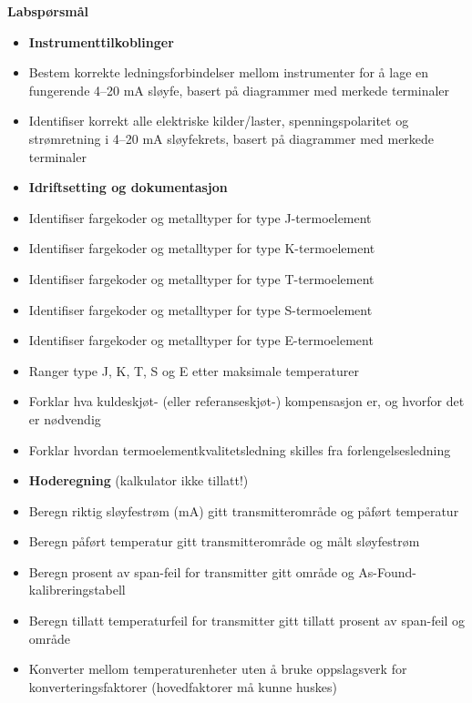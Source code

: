 \noindent
{\bf Labspørsmål}

\vskip 5pt

\begin{itemize}
\item{} {\bf Instrumenttilkoblinger}
\item{} Bestem korrekte ledningsforbindelser mellom instrumenter for å lage en fungerende 4--20 mA sløyfe, basert på diagrammer med merkede terminaler
\item{} Identifiser korrekt alle elektriske kilder/laster, spenningspolaritet og strømretning i 4--20 mA sløyfekrets, basert på diagrammer med merkede terminaler
\end{itemize}

\filbreak

\begin{itemize}
\item{} {\bf Idriftsetting og dokumentasjon}
\item{} Identifiser fargekoder og metalltyper for type J-termoelement
\item{} Identifiser fargekoder og metalltyper for type K-termoelement
\item{} Identifiser fargekoder og metalltyper for type T-termoelement
\item{} Identifiser fargekoder og metalltyper for type S-termoelement
\item{} Identifiser fargekoder og metalltyper for type E-termoelement
\item{} Ranger type J, K, T, S og E etter maksimale temperaturer
\item{} Forklar hva kuldeskjøt- (eller referanseskjøt-) kompensasjon er, og hvorfor det er nødvendig
\item{} Forklar hvordan termoelementkvalitetsledning skilles fra forlengelsesledning
\end{itemize}

\filbreak

\begin{itemize}
\item{} {\bf Hoderegning} (kalkulator ikke tillatt!)
\item{} Beregn riktig sløyfestrøm (mA) gitt transmitterområde og påført temperatur
\item{} Beregn påført temperatur gitt transmitterområde og målt sløyfestrøm
\item{} Beregn prosent av span-feil for transmitter gitt område og As-Found-kalibreringstabell
\item{} Beregn tillatt temperaturfeil for transmitter gitt tillatt prosent av span-feil og område
\item{} Konverter mellom temperaturenheter uten å bruke oppslagsverk for konverteringsfaktorer (hovedfaktorer må kunne huskes)
\end{itemize}

